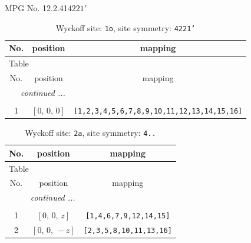 \documentclass[fleqn,8pt]{jsarticle}
\begin{document}
\setcounter{MaxMatrixCols}{32}

\renewcommand{\tablename}{Table~}
\renewcommand{\figurename}{Figure~}
\begin{center}
\LARGE
MPG No. 12.2.41\quad$4221'$
\end{center}
\renewcommand{\arraystretch}{1.2}
\begin{longtable}{ccc}
\caption{Wyckoff site: {\tt 1o}, site symmetry: {\tt 4221'}}
 \\
 \hline \hline
No. & position & mapping \\ \hline \endfirsthead

\multicolumn{2}{l}{\tablename\ \thetable{}} \\
 \hline \hline
No. & position & mapping \\ \hline \endhead

 \hline \hline
\multicolumn{2}{r}{\footnotesize\it continued ...} \\ \endfoot

 \hline \hline
\multicolumn{2}{r}{} \\ \endlastfoot

1 & $\left[ 0,\, 0,\, 0 \right]$ & {\tt [1,2,3,4,5,6,7,8,9,10,11,12,13,14,15,16]} \\
\end{longtable}
\renewcommand{\arraystretch}{1.2}
\begin{longtable}{ccc}
\caption{Wyckoff site: {\tt 2a}, site symmetry: {\tt 4..}}
 \\
 \hline \hline
No. & position & mapping \\ \hline \endfirsthead

\multicolumn{2}{l}{\tablename\ \thetable{}} \\
 \hline \hline
No. & position & mapping \\ \hline \endhead

 \hline \hline
\multicolumn{2}{r}{\footnotesize\it continued ...} \\ \endfoot

 \hline \hline
\multicolumn{2}{r}{} \\ \endlastfoot

1 & $\left[ 0,\, 0,\, z \right]$ & {\tt [1,4,6,7,9,12,14,15]} \\ \hline
2 & $\left[ 0,\, 0,\, - z \right]$ & {\tt [2,3,5,8,10,11,13,16]} \\
\end{longtable}
\renewcommand{\arraystretch}{1.2}
\end{document}
